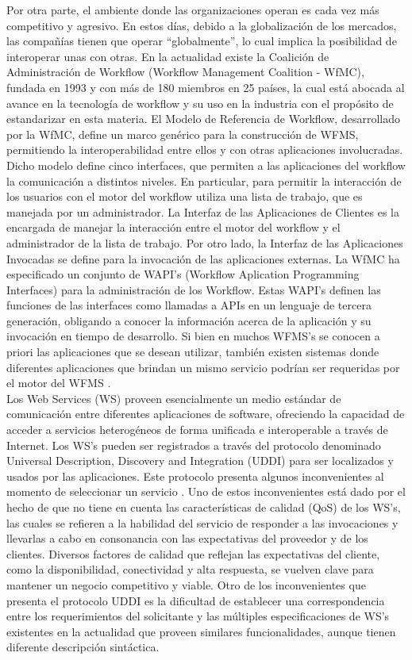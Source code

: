 Por otra parte, el ambiente donde las organizaciones operan es cada vez más competitivo y agresivo. En estos días, debido a la globalización de los mercados, las compañías tienen que operar “globalmente”, lo cual implica la posibilidad de interoperar unas con otras. En la actualidad existe la Coalición de Administración de Workflow (Workflow Management Coalition - WfMC), fundada en 1993 y con más de 180 miembros en 25 países, la cual está abocada al avance en la tecnología de workflow y su uso en la industria con el propósito de estandarizar en esta materia. El Modelo de Referencia de Workflow, desarrollado por la WfMC, define un marco genérico para la construcción de WFMS, permitiendo la interoperabilidad entre ellos y con otras aplicaciones involucradas. Dicho modelo define cinco interfaces, que permiten a las aplicaciones del workflow la comunicación a distintos niveles. En particular, para permitir la interacción de los usuarios con el motor del workflow utiliza una lista de trabajo, que es manejada por un administrador. La Interfaz de las Aplicaciones de Clientes es la encargada de manejar la interacción entre el motor del workflow y el administrador de la lista de trabajo. Por otro lado, la Interfaz de las Aplicaciones Invocadas se define para la invocación de las aplicaciones externas. La WfMC ha especificado un conjunto de WAPI's (Workflow Aplication Programming Interfaces) para la administración de los Workflow. Estas WAPI's definen las funciones de las interfaces como llamadas a APIs en un lenguaje de tercera generación, obligando a conocer la información acerca de la aplicación y su invocación en tiempo de desarrollo. Si bien en muchos WFMS's se conocen a priori las aplicaciones que se desean utilizar, también existen sistemas donde diferentes aplicaciones que brindan un mismo servicio podrían ser requeridas por el motor del WFMS \cite{WfMC09}.\\
Los Web Services (WS) proveen esencialmente un medio estándar de comunicación entre diferentes aplicaciones de software, ofreciendo la capacidad de acceder a servicios heterogéneos de forma unificada e interoperable a través de Internet. Los WS's pueden ser registrados a través del protocolo denominado Universal Description, Discovery and Integration (UDDI) para ser localizados y usados por las aplicaciones. Este protocolo presenta algunos inconvenientes al momento de seleccionar un servicio \cite{UDDI}. Uno de estos inconvenientes está dado por el hecho de que no tiene en cuenta las características de calidad (QoS) de los WS's, las cuales se refieren a la habilidad del servicio de responder a las invocaciones y llevarlas a cabo en consonancia con las expectativas del proveedor y de los clientes. Diversos factores de calidad que reflejan las expectativas del cliente, como la disponibilidad, conectividad y alta respuesta, se vuelven clave para mantener un negocio competitivo y viable. Otro de los inconvenientes que presenta el protocolo UDDI es la dificultad de establecer una correspondencia entre los requerimientos del solicitante y las múltiples especificaciones de WS's existentes en la actualidad que proveen similares funcionalidades, aunque tienen diferente descripción sintáctica. \\\\

